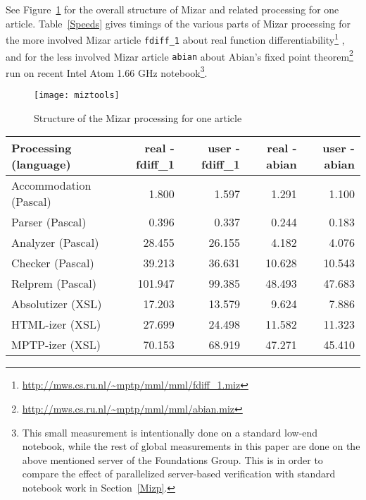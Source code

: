 \documentclass{llncs}
\begin{document}
See Figure~\ref{Structure} for the overall structure of Mizar and
related processing for one article. Table~\ref{Speeds} gives timings
of the various parts of Mizar processing for the more involved Mizar
article {\tt fdiff\_1} about real function
differentiability\footnote{\url{http://mws.cs.ru.nl/~mptp/mml/mml/fdiff_1.miz}} \cite{FDIFF1},
and for the less involved Mizar article {\tt abian} about Abian's
fixed point theorem\footnote{\url{http://mws.cs.ru.nl/~mptp/mml/mml/abian.miz}} \cite{ABIAN} run
on recent Intel Atom 1.66 GHz notebook\footnote{This small measurement
  is intentionally done on a standard low-end notebook, while the rest
  of global measurements in this paper are done on the above mentioned
  server of the Foundations Group. This is in order to compare the
  effect of parallelized server-based verification with standard notebook work in
  Section~\ref{Mizp}.}.
\vspace{-5mm}
\begin{figure}[htbp]
  \caption{Structure of the Mizar processing for one article}
    \texttt{[image: miztools]}
  \label{Structure}
\end{figure}
\vspace{-1cm}
\begin{table*}[hbp]
  \caption{Speed of various parts of the Mizar processing on articles fdiff\_1 and abian in seconds - real time and user time}
\begin{center}
  \begin{tabular}{|l|r|r|r|r|}
    \hline
    Processing (language)&real - fdiff\_1 &user - fdiff\_1&real - abian&user - abian\\
    \hline
    Accommodation (Pascal)&1.800&1.597&1.291&1.100\\
    \hline    
    Parser (Pascal)&0.396&0.337&0.244&0.183\\
    \hline    
    Analyzer (Pascal)&28.455&26.155&4.182&4.076\\
    \hline    
    Checker (Pascal)&39.213&36.631&10.628&10.543\\
    \hline    
    Relprem (Pascal)&101.947&99.385&48.493&47.683\\
    \hline    
    Absolutizer (XSL)&17.203&13.579&9.624&7.886\\
    \hline    
    HTML-izer (XSL)&27.699&24.498&11.582&11.323\\
    \hline    
    MPTP-izer (XSL)&70.153&68.919&47.271&45.410\\
    \hline    
  \end{tabular}
\end{center}
\label{Speeds}
\end{table*}
\end{document}
